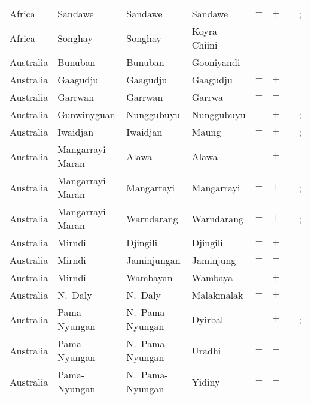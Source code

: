 \begin{landscape}
\begin{longtable}{l>{\raggedright\arraybackslash}p{2.2cm}>{\raggedright}p{2.5cm}>{\raggedright\arraybackslash}p{2.5cm}cc>{\raggedright\arraybackslash}p{3.4cm}>{\raggedright\arraybackslash}p{3.4cm}}
Africa & Sandawe & Sandawe & Sandawe & $-$ & $+$ & \citealt{Gil2013} & \citealt[295]{Nichols1992}; \citealt[14--17]{Eaton2010}\\
Africa & Songhay & Songhay & Koyra Chiini & $-$ & $-$ & \citealt{Gil2013} & \citealt[55]{Heath1999}\\
Australia & Bunuban & Bunuban & Gooniyandi & $-$ & $-$ & \citealt{Gil2013} & \citealt{Corbett2013}\\
Australia & Gaagudju & Gaagudju & Gaagudju & $-$ & $+$ & \citealt{Gil2013} & \citealt[144--157]{Harvey2002}\\
Australia & Garrwan & Garrwan & Garrwa & $-$ & $-$ & \citealt{Gil2013} & \citealt[38, 190]{Mushin2012}\\
Australia & Gunwinyguan & Nunggubuyu & Nunggubuyu & $-$ & $+$ & \citealt{Gil2013} & \citealt{Corbett2013}; \citealt[131--132]{Heath1983}\\
Australia & Iwaidjan & Iwaidjan & Maung & $-$ & $+$ & \citealt{Gil2013} & \citealt{Corbett2013}; \citealt[73--77]{Capell1970}\\
Australia & Mangarrayi-Maran & Alawa & Alawa & $-$ & $+$ & \citealt[passim]{Sharpe1972} & \citealt[66, 79--80]{Sharpe1972}\\
Australia & Mangarrayi-Maran & Mangarrayi & Mangarrayi & $-$ & $+$ & \citealt{Gil2013} & \citealt{Corbett2013}; \citealt[297]{Nichols1992}\\
Australia & Mangarrayi-Maran & Warndarang & Warndarang & $-$ & $+$ & \citealt{Gil2013} & \citealt[299]{Nichols1992}; \citealt[22--23]{Heath1980}\\
Australia & Mirndi & Djingili & Djingili & $-$ & $+$ & \citealt{Gil2013} & \citealt[247--248, 253--259]{Pensalfini1997}\\
Australia & Mirndi & Jaminjungan & Jaminjung & $-$ & $-$ & \citealt{Gil2013} & \citealt[passim]{Schultze-Berndt2000}\\
Australia & Mirndi & Wambayan & Wambaya & $-$ & $+$ & \citealt[72--80]{Nordlinger1998}& \citealt[59--70]{Nordlinger1998}\\
Australia & N.~Daly & N.~Daly & Malakmalak & $-$ & $+$ & \citealt{Gil2013} & \citealt[30--31]{Birk1976}\\
Australia & Pama-Nyungan & N.~Pama-Nyungan & Dyirbal & $-$ & $+$ & \citealt{Gil2013} & \citealt{Corbett2013}; \citealt[44]{Dixon1972}\\
Australia & Pama-Nyungan & N.~Pama-Nyungan & Uradhi & $-$ & $-$ & \citealt{Gil2013} & \citealt{Corbett2013}\\
Australia & Pama-Nyungan & N.~Pama-Nyungan & Yidiny & $-$ & $-$ & \citealt{Gil2013} & \citealt{Corbett2013}\\

\end{longtable}
\end{landscape}
